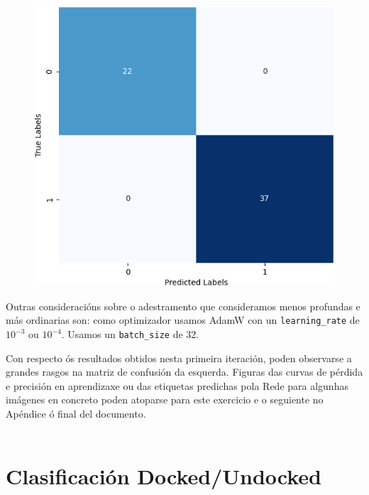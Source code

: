 \documentclass{article}
\begin{document}
\begin{figure}
	\includegraphics[width=1\linewidth]{cmEj1} 
	\label{fig:cmEj1}
\end{figure}


Outras consideracións sobre o adestramento que consideramos menos profundas e más ordinarias son: como optimizador usamos AdamW \cite{DBLP:journals/corr/abs-1711-05101} con un \texttt{learning\_rate} de $10^{-3}$ ou $10^{-4}$. Usamos un \texttt{batch\_size} de 32.

Con respecto ós resultados obtidos nesta primeira iteración, poden observarse a grandes rasgos na matriz de confusión da esquerda. Figuras das curvas de pérdida e precisión en aprendizaxe ou das etiquetas predichas pola Rede para algunhas imágenes en concreto poden atoparse para este exercicio e o seguiente no Apéndice ó final del documento. \\
\\
\newpage 
\section{Clasificación Docked/Undocked}
\end{document}

